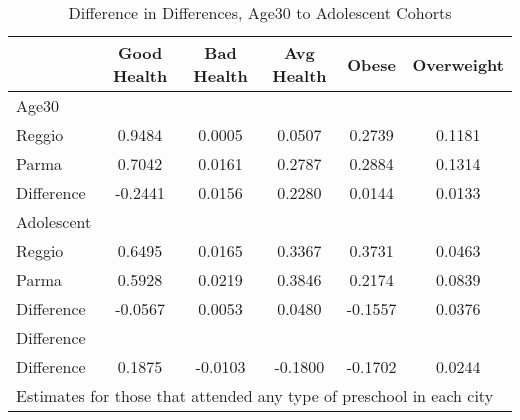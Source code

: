 \begin{table}[htbp]\centering
\caption{Difference in Differences, Age30 to Adolescent Cohorts}
\begin{tabular}{l*{5}{c}}
\hline\hline
            & Good Health&  Bad Health&  Avg Health&       Obese&  Overweight\\
\hline
Age30       &            &            &            &            &            \\
Reggio      &      0.9484&      0.0005&      0.0507&      0.2739&      0.1181\\
Parma       &      0.7042&      0.0161&      0.2787&      0.2884&      0.1314\\
Difference  &     -0.2441&      0.0156&      0.2280&      0.0144&      0.0133\\
\hline
Adolescent  &            &            &            &            &            \\
Reggio      &      0.6495&      0.0165&      0.3367&      0.3731&      0.0463\\
Parma       &      0.5928&      0.0219&      0.3846&      0.2174&      0.0839\\
Difference  &     -0.0567&      0.0053&      0.0480&     -0.1557&      0.0376\\
\hline
Difference  &            &            &            &            &            \\
Difference  &      0.1875&     -0.0103&     -0.1800&     -0.1702&      0.0244\\
\hline\hline
\multicolumn{6}{l}{\footnotesize Estimates for those that attended any type of preschool in each city}\\
\end{tabular}
\end{table}
